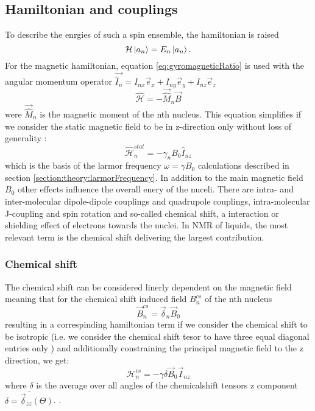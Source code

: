        \subsection{Hamiltonian and couplings}
            To describe the enrgies of such a spin ensemble, the hamiltonian is raised
            \begin{equation*}
                \mathcal{H}\ket{a_n} = E_n \ket{a_n}.
            \end{equation*}
            For the magnetic hamiltonian, equation \ref{eq:gyromagneticRatio} is used with the angular momentum operator $\vec{\hat I_n} = I_{nx}\vec e_x + I_{ny}\vec e_y + I_{nz}\vec e_z$
            \begin{equation}
                \mathcal{\hat H} = - \vec{\hat M}_n \vec B
            \end{equation}
            were $\vec{\hat M}_n$ is the magnetic moment of the nth nucleus. This equation simplifies if we consider the static magnetic field to be in z-direction only without loss of generality \cite{ashok_lectures_2013}:
            \begin{equation}
                \mathcal{\hat H}_n^{stat} = - \gamma_n B_0 \hat{I}_{nz}
            \end{equation}
            which is the basis of the larmor frequency $\omega = \gamma B_0$ calculations described in section \ref{section:theory:larmorFrequency}.
            In addition to the main magnetic field $B_0$ other effects influence the overall enery of the nuceli. There are intra- and inter-molecular dipole-dipole couplings and quadrupole couplings, intra-molecular J-coupling and spin rotation and so-called chemical shift, a interaction or shielding effect of electrons towards the nuclei.
            In NMR of liquids, the most relevant term is the chemical shift delivering the largest contribution. 
        \subsubsection{Chemical shift}
            The chemical shift can be considered linerly dependent on the magnetic field meaning that for the chemical shift induced field $B_n^{cs}$ of the nth nucleus
            \begin{equation}
                \vec B_n^{cs} = \vec{\delta}_n\vec B_0
            \end{equation}
            resulting in a correspinding hamiltonian term if we consider the chemical shift to be isotropic (i.e. we consider the chemical shift tesor to have three equal diagonal entries only \cite{levitt_spin_nodate} ) and additionally constraining the principal magnetic field to the z direction, we get:
            \begin{equation}
                \mathcal H_n^{cs} = -\gamma \delta\vec B_0 \vec I_{nz}
            \end{equation}
            where $\delta$ is the average over all angles of the chemicalshift tensors z component $\bar{\delta = \vec{ \delta}_{zz}(\Theta)}$.  \cite{abraham_proton_1997}.
